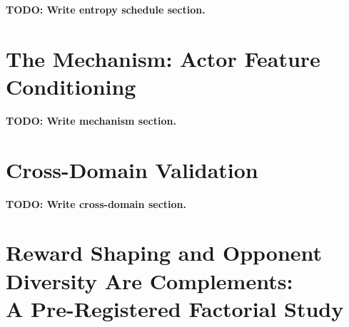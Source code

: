 \documentclass[letterpaper]{article}
\begin{document}

\textbf{TODO: Write entropy schedule section.}

\section{The Mechanism: Actor Feature Conditioning}
\label{sec:mechanism}


\textbf{TODO: Write mechanism section.}

\section{Cross-Domain Validation}
\label{sec:crossdomain}


\textbf{TODO: Write cross-domain section.}

\section{Reward Shaping and Opponent Diversity Are Complements:\\A Pre-Registered Factorial Study}
\label{sec:designc}
\end{document}
